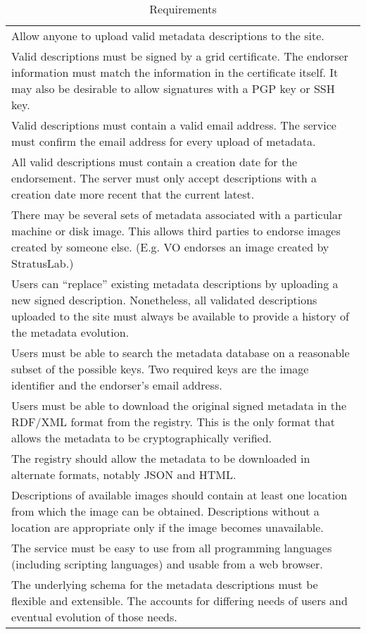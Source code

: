 \begin{table}
\caption{Requirements}
\label{tab:requirements}
\begin{tabular}{p{}}
\hline\hline
Allow anyone to upload valid metadata descriptions to the site.

\\ Valid descriptions must be signed by a grid certificate.  The
  endorser information must match the information in the certificate
  itself.  It may also be desirable to allow signatures with a PGP key
  or SSH key.

\\ Valid descriptions must contain a valid email address.  The
  service must confirm the email address for every upload of metadata.

\\ All valid descriptions must contain a creation date for the
  endorsement.  The server must only accept descriptions with a
  creation date more recent that the current latest.

\\ There may be several sets of metadata associated with a
  particular machine or disk image. This allows third parties to
  endorse images created by someone else. (E.g. VO endorses an image
  created by StratusLab.)

\\ Users can ``replace'' existing metadata descriptions by
  uploading a new signed description.  Nonetheless, all validated
  descriptions uploaded to the site must always be available to
  provide a history of the metadata evolution.

\\ Users must be able to search the metadata database on a
  reasonable subset of the possible keys.  Two required keys are the
  image identifier and the endorser's email address.

\\ Users must be able to download the original signed metadata in
  the RDF/XML format from the registry.  This is the only format that
  allows the metadata to be cryptographically verified.

\\ The registry should allow the metadata to be downloaded in
  alternate formats, notably JSON and HTML.

\\ Descriptions of available images should contain at least one
  location from which the image can be obtained.  Descriptions without
  a location are appropriate only if the image becomes unavailable.

\\ The service must be easy to use from all programming languages
  (including scripting languages) and usable from a web browser.

\\ The underlying schema for the metadata descriptions must be
  flexible and extensible.  The accounts for differing needs of users
  and eventual evolution of those needs.

\\

\hline\hline
\end{tabular}
\end{table}
